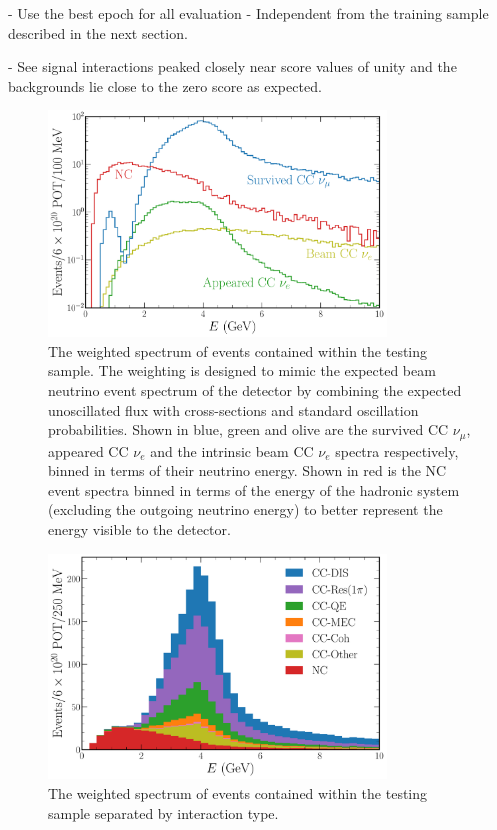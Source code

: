 - Use the best epoch for all evaluation
- Independent from the training sample described in the next section.

- See signal interactions peaked closely near score values of unity and the backgrounds lie close
to the zero score as expected.

\begin{figure} %
    \includegraphics[width=0.8\textwidth]{diagrams/6-cvn/chipsnet/explore_osc_fluxes.pdf}
    \caption[Weighted spectrum of testing sample events.]
    {The weighted spectrum of events contained within the testing sample. The weighting is
        designed to mimic the expected beam neutrino event spectrum of the \chips detector by
        combining the expected unoscillated flux with cross-sections and standard oscillation
        probabilities. Shown in blue, green and olive are the survived CC $\nu_{\mu}$, appeared CC
        $\nu_{e}$ and the intrinsic beam CC $\nu_{e}$ spectra respectively, binned in terms of
        their neutrino energy. Shown in red is the NC event spectra binned in terms of the energy
        of the hadronic system (excluding the outgoing neutrino energy) to better represent the
        energy visible to the detector.}
    \label{fig:explore_osc_fluxes}
\end{figure}

\begin{figure} %
    \includegraphics[width=0.8\textwidth]{diagrams/6-cvn/chipsnet/explore_stacked_int_types.pdf}
    \caption[Weighted spectrum of interaction types within the testing sample.]
    {The weighted spectrum of events contained within the testing sample separated by interaction
        type.}
    \label{fig:explore_stacked_int_types}
\end{figure}

